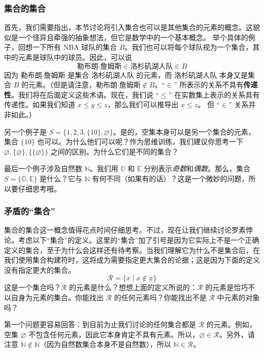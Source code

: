 \subsubsection*{集合的集合}

首先，我们需要指出，本节讨论将引入集合也可以是其他集合的元素的概念。这貌似是一个怪异且牵强的抽象想法，但它是数学中的一个基本概念。
举个具体的例子，回想一下所有 NBA 球队的集合 $B$。我们也可以将每个球队视为一个集合，其中的元素是球队中的球员。因此，可以说
\[\text{勒布朗·詹姆斯} \in \text{洛杉矶湖人队} \in B\]
因为 $\text{勒布朗·詹姆斯}$ 是集合 $\text{洛杉矶湖人队}$ 的元素，而 $\text{洛杉矶湖人队}$ 本身又是集合 $B$ 的元素。（但是请注意，$\text{勒布朗·詹姆斯} \notin B$。``$\in$'' 所表示的关系不具有\textbf{传递性}。我们将在后面定义这些术语。现在，我们说 ``$\le$'' 在实数集上表示的关系具有传递性。如果我们知道 $x \le y \le z$，那么我们可以推导出 $x \le z$。 但 ``$\in$'' 关系并非如此。）

另一个例子是 $S = \{1, 2, 3, \{10\}, \varnothing \}$。是的，空集本身可以是另一个集合的元素，集合 $\{10\}$ 也可以。为什么他们可以呢？作为思维训练，我们建议你思考一下 $\varnothing, \{\varnothing\}, \{\{\varnothing\}\}$ 之间的区别。为什么它们是不同的集合？

最后一个例子涉及自然数 $\mathbb{N}$。我们用 $\mathbb{O}$ 和 $\mathbb{E}$ 分别表示\emph{奇数}和\emph{偶数}。那么，集合 $S = \{\mathbb{O}, \mathbb{E}\}$ 是什么？它与 $\mathbb{N}$ 有何不同（如果有的话）？这是一个微妙的问题，所以要仔细思考哦。

\subsubsection*{矛盾的``集合''}

集合的集合这一概念值得花点时间仔细思考。不过，现在让我们继续讨论罗素悖论。考虑以下``集合''的定义。这里的``集合''加了引号是因为它实际上不是一个正确定义的集合，至于为什么会这样还有待考察。当我们理解它为什么不是集合后，在我们使用集合构建符时，这将成为需要指定更大集合的论据；这是因为下面的定义没有指定更大的集合。
\[\mathcal{R} = \{x \mid x \notin x\}\]
这是一个集合吗？$\mathcal{R}$ 的元素是什么？想想上面的定义所说的：$\mathcal{R}$ 的元素是恰巧不以自身为元素的集合。你能找出 $\mathcal{R}$ 的任何元素吗？你能找出不是 $\mathcal{R}$ 中元素的对象吗？

第一个问题更容易回答：到目前为止我们讨论的任何集合都是 $\mathcal{R}$ 的元素。例如，空集 $\varnothing$ 不包含任何元素，因此它本身肯定不具有元素。所以，$\varnothing \in \mathcal{R}$。另外，请注意 $\mathbb{N} \notin \mathbb{N}$（因为自然数集合本身不是自然数），所以 $\mathbb{N} \in \mathcal{R}$。

